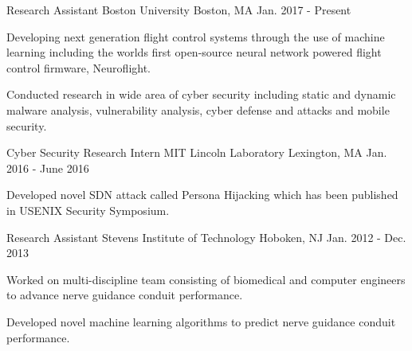 


\begin{cventries}

  \cventry
    {Research Assistant} %
    {Boston University} %
    {Boston, MA} %
    {Jan. 2017 - Present} %
    {
      \begin{cvitems} %
\item {Developing next generation flight control systems through the use of
machine learning including the worlds first open-source neural network powered flight control
firmware, Neuroflight.}
      \item {Conducted research in wide area of cyber security including static
and dynamic malware analysis, vulnerability analysis, cyber defense and attacks
and mobile security.}
      \end{cvitems}
    }

  \cventry
    {Cyber Security Research Intern } %
    {MIT Lincoln Laboratory} %
    {Lexington, MA} %
    {Jan. 2016 - June 2016} %
    {
      \begin{cvitems} %
      \item {Developed novel SDN attack called Persona Hijacking which has been published in USENIX Security Symposium.}
      \end{cvitems}
    }

  \cventry
    {Research Assistant} %
    {Stevens Institute of Technology} %
    {Hoboken, NJ} %
    {Jan. 2012 - Dec. 2013} %
    {
      \begin{cvitems} %
      \item {Worked on multi-discipline team consisting of biomedical and computer
engineers to advance nerve guidance conduit performance.}
       \item {Developed novel machine learning algorithms to predict nerve guidance conduit performance. }
      \end{cvitems}
    }

\end{cventries}
